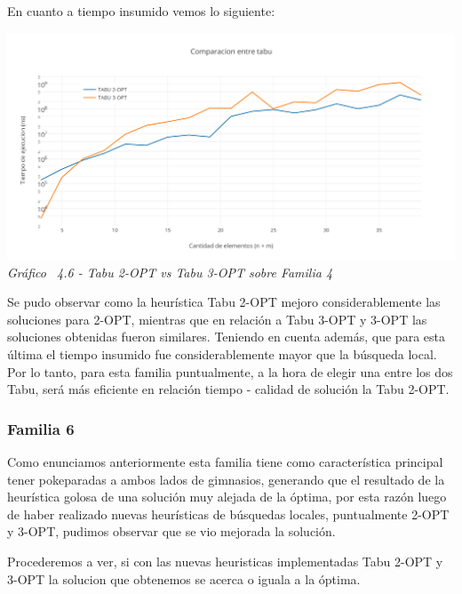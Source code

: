 En cuanto a tiempo insumido vemos lo siguiente:

\vspace*{0.3cm} \vspace*{0.3cm}
  \begin{center}
 \includegraphics[scale=0.5]{./EJ4/comparaciongym01.png}\\
 {            \textit{Gráfico \ 4.6 - Tabu 2-OPT vs Tabu 3-OPT sobre Familia 4}}
  \end{center}
  \vspace*{0.3cm}

Se pudo observar como la heur\'istica Tabu 2-OPT mejoro considerablemente las soluciones para 2-OPT, mientras que en relaci\'on a Tabu 3-OPT y 3-OPT las soluciones obtenidas fueron similares. Teniendo en cuenta adem\'as, que para esta \'ultima el tiempo insumido fue considerablemente mayor que la b\'usqueda local.
Por lo tanto, para esta familia puntualmente, a la hora de elegir una entre los dos Tabu, ser\'a m\'as eficiente en relaci\'on tiempo - calidad de soluci\'on la Tabu 2-OPT.


\subsubsection*{Familia 6}

Como enunciamos anteriormente esta familia tiene como caracter\'istica principal tener pokeparadas a ambos lados de gimnasios, generando que el resultado de la heur\'istica golosa de una soluci\'on muy alejada de la \'optima, por esta raz\'on luego de haber realizado nuevas heur\'isticas de b\'usquedas locales, puntualmente 2-OPT y 3-OPT, pudimos observar que se vio mejorada la soluci\'on. 

Procederemos a ver, si con las nuevas heuristicas implementadas Tabu 2-OPT y 3-OPT la solucion que obtenemos se acerca o iguala a la \'optima.

